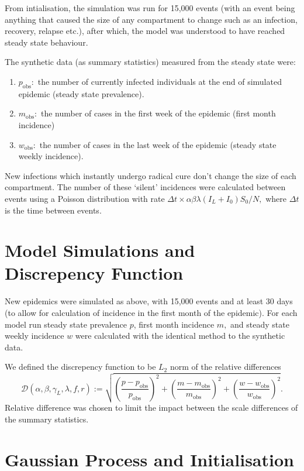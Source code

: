 From intialisation, the simulation was run for 15,000 events
(with an event being anything that caused the size of any compartment to change
such as an infection, recovery, relapse etc.), after which, the model was
understood to have reached steady state behaviour.

The synthetic data (as summary statistics) measured from the steady state
were:
\begin{enumerate}
    \item $p_\text{obs}:$ the number of currently infected individuals at the
          end of simulated epidemic (steady state prevalence).
    \item $m_\text{obs}:$ the number of cases in the first week of the epidemic
          (first month incidence)
    \item $w_\text{obs}:$ the number of cases in the last week of the epidemic
          (steady state weekly incidence).
\end{enumerate}

New infections which instantly undergo radical cure don't change the size of
each compartment. The number of these `silent' incidences were calculated
between events using a Poisson distribution with rate
$\Delta t \times \alpha \beta \lambda (I_L + I_0) S_0 / N,$ where $\Delta t$ is
the time between events.

\section{Model Simulations and Discrepency Function}

New epidemics were simulated as above, with 15,000 events and at least 30
days (to allow for calculation of incidence in the first month of the
epidemic). For each model run steady state prevalence $p$,
first month incidence $m,$ and steady state weekly incidence $w$ were
calculated with the identical method to the synthetic data.

We defined the discrepency function to be $L_2$ norm of the relative
differences
$$
    \mathcal{D}(\alpha, \beta, \gamma_L, \lambda, f, r)
    := \sqrt{
        \left(\frac{p - p_\text{obs}}{p_\text{obs}}\right)^2
        + \left(\frac{m - m_\text{obs}}{m_\text{obs}}\right)^2
        + \left(\frac{w - w_\text{obs}}{w_\text{obs}}\right)^2
    }.
$$
Relative difference was chosen to limit the impact between the scale
differences of the summary statistics.

\section{Gaussian Process and Initialisation}

